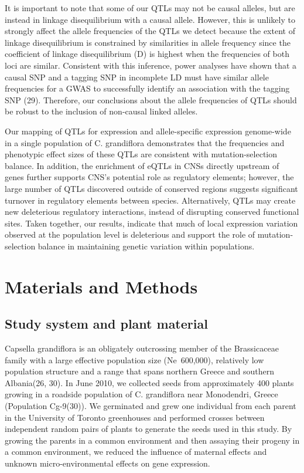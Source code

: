 It is important to note that some of our QTLs may not be causal alleles, but are instead in linkage disequilibrium with a causal allele. However, this is unlikely to strongly affect the allele frequencies of the QTLs we detect because the extent of linkage disequilibrium is constrained by similarities in allele frequency since the coefficient of linkage disequilibrium (D) is highest when the frequencies of both loci are similar. Consistent with this inference, power analyses have shown that a causal SNP and a tagging SNP in incomplete LD must have similar allele frequencies for a GWAS to successfully identify an association with the tagging SNP (29). Therefore, our conclusions about the allele frequencies of QTLs should be robust to the inclusion of non-causal linked alleles. 

Our mapping of QTLs for expression and allele-specific expression genome-wide in a single population of C. grandiflora demonstrates that the frequencies and phenotypic effect sizes of these QTLs are consistent with mutation-selection balance. In addition, the enrichment of eQTLs in CNSs directly upstream of genes further supports CNS’s potential role as regulatory elements; however, the large number of QTLs discovered outside of conserved regions suggests significant turnover in regulatory elements between species. Alternatively, QTLs may create new deleterious regulatory interactions, instead of disrupting conserved functional sites. Taken together, our results, indicate that much of local expression variation observed at the population level is deleterious and support the role of mutation-selection balance in maintaining genetic variation within populations.

\section{Materials and Methods}

\subsection{Study system and plant material}
Capsella grandiflora is an obligately outcrossing member of the Brassicaceae family with a large effective population size (Ne~600,000), relatively low population structure and a range that spans northern Greece and southern Albania(26, 30). In June 2010, we collected seeds from approximately 400 plants growing in a roadside population of C. grandiflora near Monodendri, Greece (Population Cg-9(30)). We germinated and grew one individual from each parent in the University of Toronto greenhouses and performed crosses between independent random pairs of plants to generate the seeds used in this study. By growing the parents in a common environment and then assaying their progeny in a common environment, we reduced the influence of maternal effects and unknown micro-environmental effects on gene expression.

